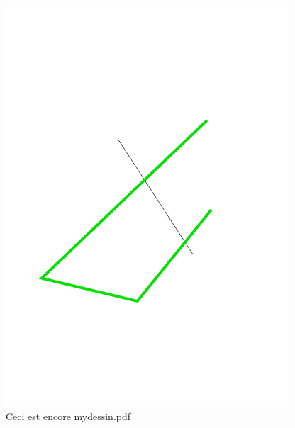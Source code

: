 \documentclass[french]{article}
\begin{document}
\begin{figure}[!h]
\centering
\includegraphics[width=300pt]{mydessin.pdf}
\caption{Ceci est encore mydessin.pdf}
\label{mydessin3}
\end{figure}
\end{document}
